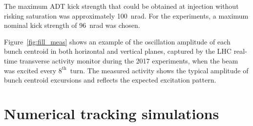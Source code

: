 \documentclass[%
 reprint,
 amsmath,amssymb,
 aps,
prstab,
longbibliography
]{revtex4-1}
\begin{document}
The maximum ADT kick strength that could be obtained at injection
without risking saturation was approximately 100~nrad. For the
experiments, a maximum nominal kick strength of 96~nrad was chosen.

Figure~\ref{fig:fill_meas} shows an example of the oscillation
amplitude of each bunch centroid in both horizontal and vertical
planes, captured by the LHC real-time transverse activity monitor
during the 2017 experiments, when the beam was excited every
$8^{\mathrm{th}}$~turn. The measured activity shows the typical
amplitude of bunch centroid excursions and reflects the expected
excitation pattern.



\section{Numerical tracking simulations}
\label{sec:sim}
\end{document}
